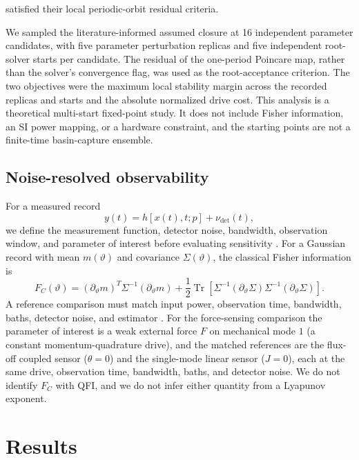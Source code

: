 \documentclass[aip,cha,reprint]{revtex4-2}
\newcommand{\Tr}{\operatorname{Tr}}
\begin{document}
satisfied their local periodic-orbit residual criteria.

We sampled the literature-informed assumed closure at 16 independent parameter
candidates, with five parameter perturbation replicas and five independent
root-solver starts per candidate. The residual of the one-period Poincare
map, rather than the solver's convergence flag, was used as the root-acceptance criterion. The two
objectives were the maximum local stability margin across the recorded replicas and
starts and the absolute normalized drive cost. This analysis is a theoretical
multi-start fixed-point study. It does not include Fisher information, an SI power
mapping, or a hardware constraint, and the starting points are not a finite-time
basin-capture ensemble.

\subsection{Noise-resolved observability}

For a measured record
\begin{equation}
y(t)=h[x(t),t;p]+\nu_{\mathrm{det}}(t),
\end{equation}
we define the measurement function, detector noise, bandwidth, observation window,
and parameter of interest before evaluating sensitivity
\cite{clerk2010,gardiner1985,walls2008,ford1988}. For a Gaussian record with
mean $m(\vartheta)$ and covariance $\Sigma(\vartheta)$, the classical Fisher
information is
\begin{equation}
F_C(\vartheta)=
(\partial_\vartheta m)^T\Sigma^{-1}(\partial_\vartheta m)
+\frac12\Tr\left[\Sigma^{-1}(\partial_\vartheta\Sigma)
\Sigma^{-1}(\partial_\vartheta\Sigma)\right].
\label{eq:fisher}
\end{equation}
A reference comparison must match input power, observation time, bandwidth, baths,
detector noise, and estimator \cite{braunstein1994,purdy2017,teufel2011,gavartin2012,li2021a,qvarfort2018}. For the force-sensing comparison the parameter of
interest is a weak external force $F$ on mechanical mode $1$ (a constant
momentum-quadrature drive), and the matched references are the flux-off coupled
sensor ($\theta=0$) and the single-mode linear sensor ($J=0$), each at the same
drive, observation time, bandwidth, baths, and detector noise. We do not identify
$F_C$ with QFI, and we do not infer either quantity from a Lyapunov exponent.

\section{Results}
\end{document}
